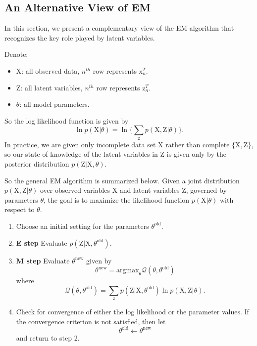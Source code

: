 \documentclass[a4paper]{book}
\newcommand{\mrm}{\mathrm}
\begin{document}
\subsection{An Alternative View of EM}
In this section, we present a complementary view of the EM algorithm that recognizes the key role played by latent variables.

Denote:
\begin{itemize}
  \item $\mrm X$: all observed data, $n^{th}$ row represents $\mrm x_n^T$.
  \item $\mrm Z$: all latent variables, $n^{th}$ row represents $\mrm z_n^T$.
  \item $\theta$: all model parameters.
\end{itemize}
So the log likelihood function is given by
\begin{equation}\label{}
  \ln p(\mrm X|\theta) = \ln\{\sum_{\mrm z}p(\mrm X,\mrm Z|\theta)\}.
\end{equation}
In practice, we are given only incomplete data set $\mrm X$ rather than complete $\{\mrm{X,Z}\}$, so our state of knowledge of the latent variables in $\mrm Z$ is given only by the posterior distribution $p(\mrm Z|\mrm X,\theta)$.

So the general EM algorithm is summarized below. Given a joint distribution $p(\mrm X,\mrm Z|\theta)$ over observed variables $\mrm X$ and latent variables $\mrm Z$, governed by parameters $\theta$, the goal is to maximize the likelihood function $p(\mrm X|\theta)$ with respect to $\theta$.
\begin{enumerate}
  \item Choose an initial setting for the parameters $\theta^{\mrm{old}}$.
  \item \textbf{E step} Evaluate $p(\mrm Z|\mrm X, \theta^{\mrm{old}})$.
  \item \textbf{M step} Evaluate $\theta^{\mrm{new}}$ given by 
  \begin{equation}\label{}
    \theta^{\mrm{new}} = \mrm{argmax}_\theta \mathcal Q(\theta,\theta^{\mrm{old}})
  \end{equation} 
  where 
  \begin{equation}\label{}
    \mathcal Q(\theta,\theta^{\mrm{old}}) = \sum_\mrm{z} p(\mrm Z|\mrm X,\theta^{{\mrm{old}}})\ln p(\mrm X,\mrm Z|\theta).
  \end{equation}
  \item Check for convergence of either the log likelihood or the parameter values. If the convergence criterion is not satisfied, then let
  \begin{equation}\label{}
    \theta^{\mrm{old}} \leftarrow \theta^{\mrm{new}} 
  \end{equation}
  and return to step 2.
\end{enumerate}
\end{document}
